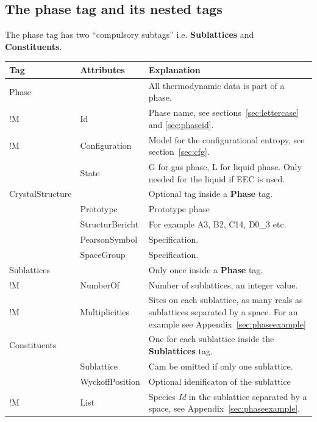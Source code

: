 \documentclass{article}
\begin{document}
\newpage 

\subsection{The phase tag and its nested tags}\label{sec:phase}\label{sec:dispart}

The phase tag has two ``compulsory subtags'' i.e. {\bf Sublattices}
and {\bf Constituents}.

\begin{tabular}{|p{} p{} p{}|}\hline
  Tag & Attributes & Explanation\\\hline

  Phase & & All thermodynamic data is part of a phase.\\
!M       & Id & Phase name, see sections~\ref{sec:lettercase} and 
               \ref{sec:phaseid}. \\

!M       & Configuration &  Model for the configurational entropy, 
                see section~\ref{sec:cfg}.\\

         & State & G for gas phase, L for liquid phase.  
                Only needed for the liquid if EEC is used.\\\hline

  CrystalStructure & & Optional tag inside a {\bf Phase} tag.\\
                
        & Prototype & Prototype phase \\
        & StructurBericht & For example A3, B2, C14, D0\_3 etc.\\
        & PearsonSymbol & Specification.\\
        & SpaceGroup & Specification.\\\hline

  Sublattices & & Only once inside a {\bf Phase} tag.\\
!M      & NumberOf &  Number of sublattices, an integer value. \\
!M      & Multiplicities & Sites on each sublattice, as many reals as
                  sublattices separated by a space.  For an example 
                  see Appendix~\ref{sec:phaseexample}\\\hline

  Constituents & & One for each sublattice inside the {\bf Sublattices} tag.\\
        & Sublattice & Cam be omitted if only one sublattice.\\
        & WyckoffPosition & Optional idenificaton of the sublattice \\
!M      & List & Species {\em Id} in the sublattice separated by
                 a space, see Appendix~\ref{sec:phaseexample}.\\\hline


\end{tabular}
\end{document}
